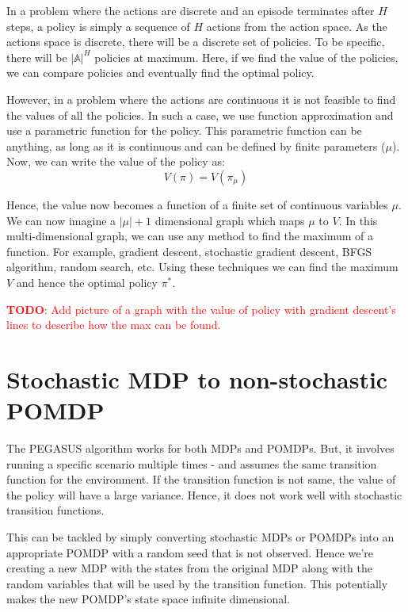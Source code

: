 \documentclass[BTech]{iitmdiss}
\newcommand\todo[1]{\textcolor{red}{{\bf TODO}: #1}}
\begin{document}
In a problem where the actions are discrete and an episode terminates after $H$ steps, a policy is simply a sequence of $H$ actions from the action space. As the actions space is discrete, there will be a discrete set of policies. To be specific, there will be $|\mathbb{A}|^{H}$ policies at maximum. Here, if we find the value of the policies, we can compare policies and eventually find the optimal policy.

However, in a problem where the actions are continuous it is not feasible to find the values of all the policies. In such a case, we use function approximation and use a parametric function for the policy. This parametric function can be anything, as long as it is continuous and can be defined by finite parameters ($\mu$). Now, we can write the value of the policy as:
\begin{equation}
  V(\pi) = V(\pi_{\mu})
\end{equation}

Hence, the value now becomes a function of a finite set of continuous variables $\mu$. We can now imagine a $|\mu|+1$ dimensional graph which maps $\mu$ to $V$. In this multi-dimensional graph, we can use any method to find the maximum of a function. For example, gradient descent, stochastic gradient descent, BFGS algorithm, random search, etc. Using these techniques we can find the maximum $V$ and hence the optimal policy $\pi^{*}$.

\todo{Add picture of a graph with the value of policy with gradient descent's lines to describe how the max can be found.}

\section{Stochastic MDP to non-stochastic POMDP}

The PEGASUS algorithm works for both MDPs and POMDPs. But, it involves running a specific scenario multiple times - and assumes the same transition function for the environment. If the transition function is not same, the value of the policy will have a large variance. Hence, it does not work well with stochastic transition functions.

This can be tackled by simply converting stochastic MDPs or POMDPs into an appropriate POMDP with a random seed that is not observed. Hence we're creating a new MDP with the states from the original MDP along with the random variables that will be used by the transition function. This potentially makes the new POMDP's state space infinite dimensional.
\end{document}
